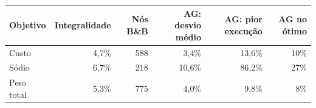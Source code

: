 \begin{tabular}{lrrrrr}
\toprule
Objetivo & Integralidade & Nós B\&B & AG: desvio médio & AG: pior execução & AG no ótimo \\
\midrule
Custo & 4{,}7\% & 588 & 3{,}4\% & 13{,}6\% & 10\% \\
Sódio & 6{,}7\% & 218 & 10{,}6\% & 86{,}2\% & 27\% \\
Peso total & 5{,}3\% & 775 & 4{,}0\% & 9{,}8\% & 8\% \\
\bottomrule
\end{tabular}
